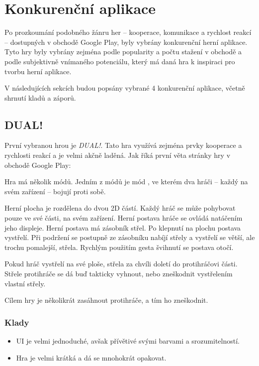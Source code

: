 \chapter{Konkurenční aplikace}

Po prozkoumání podobného žánru her
– kooperace, komunikace a rychlost reakcí –
dostupných v obchodě Google Play,
byly vybrány konkurenční herní aplikace.
Tyto hry byly vybrány zejména podle popularity a počtu stažení v obchodě
a podle subjektivně vnímaného potenciálu,
který má daná hra k inspiraci pro tvorbu herní aplikace.

V následujících sekcích budou popsány vybrané 4 konkurenční aplikace,
včetně shrnutí kladů a záporů.

\section{DUAL!}

První vybranou hrou je \emph{DUAL!}.
Tato hra využívá zejména prvky kooperace a rychlosti reakcí
a je velmi akčně laděná.
Jak říká první věta stránky hry \cite{seabaa_dual} v obchodě Google Play:

Hra má několik módů.
Jedním z módů je mód , ve kterém dva hráči
– každý na svém zařízení –
bojují proti sobě.

Herní plocha je rozdělena do dvou 2D částí.
Každý hráč se může pohybovat pouze ve své části, na svém zařízení.
Herní postava hráče se ovládá natáčením jeho displeje.
Herní postava má zásobník střel.
Po klepnutí na plochu postava vystřelí.
Při podržení se postupně ze zásobníku nabíjí střely
a vystřelí se větší, ale trochu pomalejší, střela.
Rychlým použitím gesta švihnutí se postava otočí.

Pokud hráč vystřelí na své ploše,
střela za chvíli doletí do protihráčovi části.
Střele protihráče se dá buď takticky vyhnout,
nebo zneškodnit vystřelením vlastní střely.

Cílem hry je několikrát zasáhnout protihráče, a tím ho zneškodnit.

\FloatBarrier

\subsection*{Klady}

\begin{itemize}
    \item UI je velmi jednoduché, avšak přívětivé svými barvami a srozumitelností.
    \item Hra je velmi krátká a dá se mnohokrát opakovat.
\end{itemize}

